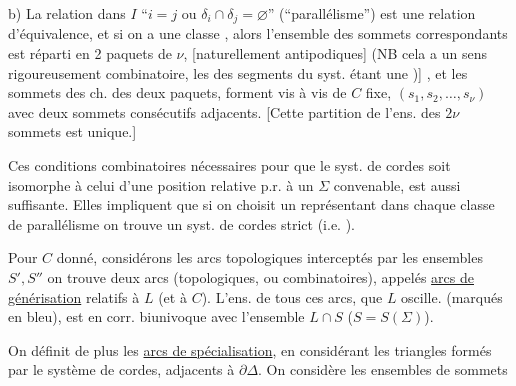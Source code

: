 b) La relation dans $I$ ``$i=j$ ou  $\delta_i\cap\delta_j=\varnothing$''  (``parallélisme'') est une relation d'équivalence, et  si on a une classe  , alors l'ensemble des \inserted{$2\nu$} sommets correspondants est réparti en 2 paquets  de $\nu$,  [naturellement antipodiques] (NB cela a un sens rigoureusement combinatoire, les  des segments du syst. étant une )] , et les sommets des ch. des deux paquets, forment vis à vis de $C$ fixe, $(s_1,s_2,\ldots,s_\nu)$ avec deux sommets consécutifs adjacents. [Cette partition de l'ens.  des $2\nu$ sommets est unique.]

Ces conditions combinatoires nécessaires pour que le syst. de cordes soit isomorphe à celui d'une position relative p.r. à un $\Sigma$ convenable, est aussi suffisante. Elles impliquent que si on choisit un représentant dans chaque classe de parallélisme on trouve un syst. de cordes strict (i.e. ).

Pour $C$ donné, considérons les arcs topologiques interceptés par les ensembles $S',S''$ on trouve deux arcs (topologiques, ou combinatoires), appelés \uline{arcs de générisation} relatifs à $L$ (et à $C$). L'ens. de tous ces arcs, que $L$ oscille. (marqués en bleu),  est en corr. biunivoque avec l'ensemble $L\cap S$ ($S=S(\Sigma)$). 

On définit de plus les \uline{arcs de spécialisation}, en considérant les triangles formés par le système de cordes, adjacents à $\partial\Delta$. On considère les ensembles de sommets
